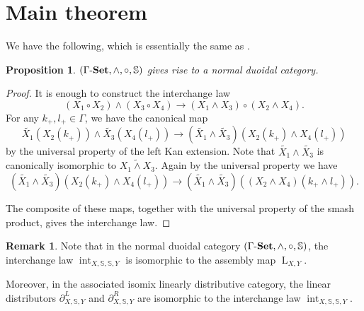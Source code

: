 \documentclass{article}
\numberwithin{equation}{section}
\newtheorem{prop}[thm]{Proposition}
\theoremstyle{definition}
\newtheorem{rem}[thm]{Remark}
\begin{document}
\section{Main theorem}
We have the following, which is essentially the same as \cite[Proposition 36]{GF}.
\begin{prop}$(\Gamma \mathchar`-\mathbf{Set}, \wedge, \circ,  \mathbb{S})$ gives rise to a normal duoidal category.
\end{prop}
\begin{proof}It is enough to construct the interchange law 
\[(X_1\circ X_2)\wedge(X_3\circ X_4)\to (X_1\wedge X_3)\circ (X_2\wedge X_4).\]
For any $k_+, l_+\in\Gamma$, we have the canonical map 
\[\tilde{X_1}(X_2(k_+))\wedge\tilde{X_3}(X_4(l_+))\to (\tilde{X_1}\wedge\tilde{X_3})(X_2(k_+)\wedge X_4(l_+))\]
by the universal property of the left Kan extension.
Note that $\tilde{X_1}\wedge\tilde{X_3}$ is canonically isomorphic to $\widetilde{X_1\wedge X_3}$.
Again by the universal property we have 
\[(\tilde{X_1}\wedge\tilde{X_3})(X_2(k_+)\wedge X_4(l_+))\to(\tilde{X_1}\wedge\tilde{X_3})((X_2\wedge X_4)(k_+\wedge l_+)).\]

The composite of these maps, together with the universal property of the smash product, gives the interchange law.
\end{proof}

\begin{rem}Note that in the normal duoidal category $(\Gamma \mathchar`-\mathbf{Set}, \wedge, \circ,  \mathbb{S})$, the interchange law $\operatorname{int}_{X, \mathbb{S}, \mathbb{S}, Y}$ is isomorphic to the assembly map $\operatorname{L}_{X, Y}$.

Moreover, in the associated isomix linearly distributive category, the linear distributors $\partial^{L}_{X, \mathbb{S}, Y}$ and $\partial^{R}_{X, \mathbb{S}, Y}$ are isomorphic to the interchange law $\operatorname{int}_{X, \mathbb{S}, \mathbb{S}, Y}$.
\end{rem}
\end{document}
